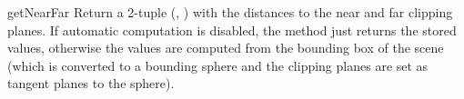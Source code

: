 \begin{methoddesc}{getNearFar}{}
Return a 2-tuple (, ) with the distances to the
near and far clipping planes. If automatic computation is disabled,
the method just returns the stored values, otherwise the values
are computed from the bounding box of the scene (which is converted
to a bounding sphere and the clipping planes are set as tangent planes
to the sphere).
\end{methoddesc}
